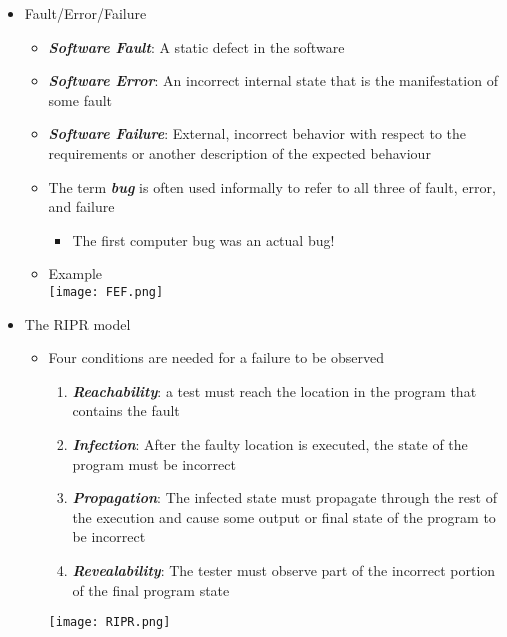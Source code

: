 \documentclass[11pt]{article}
\begin{document}
\begin{itemize}
	\item Fault/Error/Failure
		\begin{itemize}
			\item \textbf{\textit{Software Fault}}: A static defect in the software
			\item \textbf{\textit{Software Error}}: An incorrect internal state that is the manifestation of
			some fault
			\item \textbf{\textit{Software Failure}}: External, incorrect behavior with respect to the requirements or another description of the expected behaviour
			\item The term \textbf{\textit{bug }}is often used informally to refer to all three of fault, error, and failure
				\begin{itemize}
					\item The first computer bug was an actual bug!
				\end{itemize}
			\item Example\\
				\texttt{[image: FEF.png]}
		\end{itemize}


	\item The RIPR model
		\begin{itemize}
			\item Four conditions are needed for a failure to be observed
				\begin{enumerate}
					\item \textbf{\textit{Reachability}}: a test must reach the location in the program that contains the fault
					\item \textbf{\textit{Infection}}: After the faulty location is executed, the state of the program must be incorrect
					\item \textbf{\textit{Propagation}}: The infected state must propagate through the rest of the execution and cause some output or final state of the program to be incorrect
					\item \textbf{\textit{Revealability}}: The tester must observe part of the incorrect portion of the final program state
				\end{enumerate}
				\texttt{[image: RIPR.png]}
		\end{itemize}


\end{itemize}
\end{document}
